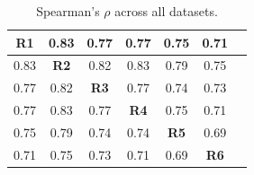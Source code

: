 \documentclass[phd,tocprelim]{cornell}
\begin{document}
\begin{table}
  \begin{tabular}{|c|*{6}{c|}}
    \toprule
    \textbf{R1} & 0.83 & 0.77 & 0.77 & 0.75 & 0.71 \\ \midrule
    0.83 & \textbf{R2} & 0.82 & 0.83 & 0.79 & 0.75 \\ \midrule
    0.77 & 0.82 & \textbf{R3} & 0.77 & 0.74 & 0.73 \\ \midrule
    0.77 & 0.83 & 0.77 & \textbf{R4} & 0.75 & 0.71 \\ \midrule
    0.75 & 0.79 & 0.74 & 0.74 & \textbf{R5} & 0.69 \\ \midrule
    0.71 & 0.75 & 0.73 & 0.71 & 0.69 & \textbf{R6} \\ \midrule
  \end{tabular}
  \caption{Spearman's $\rho$ across all datasets.}
\label{tab:correlations}
\end{table}

\end{document}
